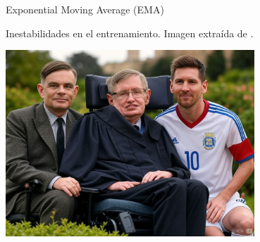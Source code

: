 \documentclass[aspectratio=169,xcolor=dvipsnames, t, spanish]{beamer}
\begin{document}
\begin{frame}{Exponential Moving Average (EMA)}
\begin{center}
\begin{minipage}{0.5\textwidth}
\begin{center}
            \end{center}
        \end{minipage}
            Inestabilidades en el entrenamiento. Imagen extraída de \citet{SongErmon2020}.
        \end{center}
    \end{frame}
    
\makefinalpage

\begin{frame}{}
\begin{center}
    \includegraphics[width=0.7\textwidth]{figures/TuringHawkingMessi.jpeg}
\end{center}
    
\end{frame}
\end{document}
